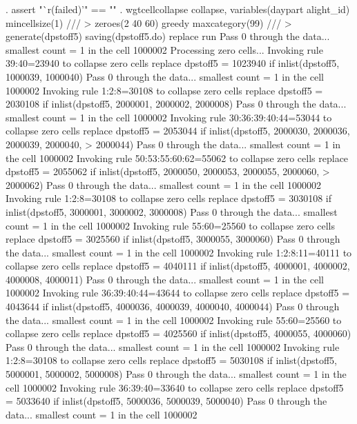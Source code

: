 . assert "`r(failed)'" == ""      
{\smallskip}
. wgtcellcollapse collapse, variables(daypart alight_id) mincellsize(1) ///
>         zeroes(2 40 60) greedy maxcategory(99) ///
>         generate(dpstoff5) saving(dpstoff5.do) replace run
Pass 0 through the data...
  smallest count = 1 in the cell      1000002
{\smallskip}
Processing zero cells...
{\smallskip}
  Invoking rule 39:40=23940 to collapse zero cells
  replace dpstoff5 = 1023940 if inlist(dpstoff5, 1000039, 1000040)
Pass 0 through the data...
  smallest count = 1 in the cell      1000002
  Invoking rule 1:2:8=30108 to collapse zero cells
  replace dpstoff5 = 2030108 if inlist(dpstoff5, 2000001, 2000002, 2000008)
Pass 0 through the data...
  smallest count = 1 in the cell      1000002
  Invoking rule 30:36:39:40:44=53044 to collapse zero cells
  replace dpstoff5 = 2053044 if inlist(dpstoff5, 2000030, 2000036, 2000039, 2000040,
>  2000044)
Pass 0 through the data...
  smallest count = 1 in the cell      1000002
  Invoking rule 50:53:55:60:62=55062 to collapse zero cells
  replace dpstoff5 = 2055062 if inlist(dpstoff5, 2000050, 2000053, 2000055, 2000060,
>  2000062)
Pass 0 through the data...
  smallest count = 1 in the cell      1000002
  Invoking rule 1:2:8=30108 to collapse zero cells
  replace dpstoff5 = 3030108 if inlist(dpstoff5, 3000001, 3000002, 3000008)
Pass 0 through the data...
  smallest count = 1 in the cell      1000002
  Invoking rule 55:60=25560 to collapse zero cells
  replace dpstoff5 = 3025560 if inlist(dpstoff5, 3000055, 3000060)
Pass 0 through the data...
  smallest count = 1 in the cell      1000002
  Invoking rule 1:2:8:11=40111 to collapse zero cells
  replace dpstoff5 = 4040111 if inlist(dpstoff5, 4000001, 4000002, 4000008, 4000011)
Pass 0 through the data...
  smallest count = 1 in the cell      1000002
  Invoking rule 36:39:40:44=43644 to collapse zero cells
  replace dpstoff5 = 4043644 if inlist(dpstoff5, 4000036, 4000039, 4000040, 4000044)
Pass 0 through the data...
  smallest count = 1 in the cell      1000002
  Invoking rule 55:60=25560 to collapse zero cells
  replace dpstoff5 = 4025560 if inlist(dpstoff5, 4000055, 4000060)
Pass 0 through the data...
  smallest count = 1 in the cell      1000002
  Invoking rule 1:2:8=30108 to collapse zero cells
  replace dpstoff5 = 5030108 if inlist(dpstoff5, 5000001, 5000002, 5000008)
Pass 0 through the data...
  smallest count = 1 in the cell      1000002
  Invoking rule 36:39:40=33640 to collapse zero cells
  replace dpstoff5 = 5033640 if inlist(dpstoff5, 5000036, 5000039, 5000040)
Pass 0 through the data...
  smallest count = 1 in the cell      1000002

